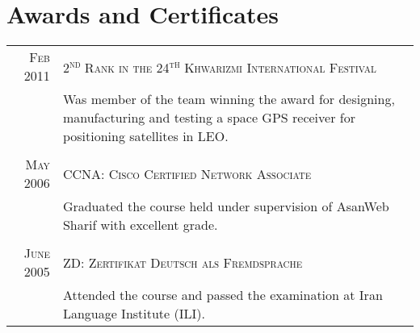 \documentclass[a4paper,10pt]{article}
\begin{document}
\section{Awards and Certificates}
\begin{tabular}{r|p{11cm}}%
\textsc{Feb} 2011 & \textsc{2\textsuperscript{nd} Rank in the 24\textsuperscript{th} Khwarizmi International Festival}\\
& \footnotesize{Was member of the team winning the award for designing, manufacturing and testing a space GPS receiver for positioning satellites in LEO.}\\\multicolumn{2}{c}{}\\
\textsc{May} 2006 & \textsc{CCNA: Cisco Certified Network Associate}\\
& \footnotesize{Graduated the course held under supervision of AsanWeb Sharif with excellent grade.}\\\multicolumn{2}{c}{}\\
\textsc{June} 2005 & \textsc{ZD: Zertifikat Deutsch als Fremdsprache}\\
& \footnotesize{Attended the course and passed the examination at Iran Language Institute (ILI)}.
\end{tabular}

\end{document}
